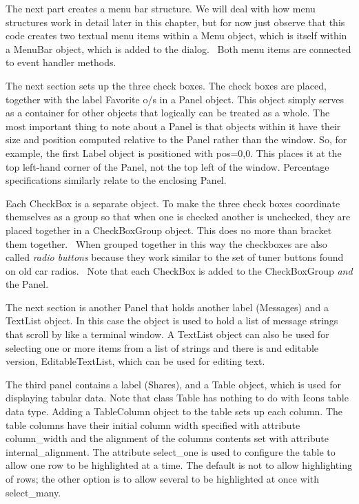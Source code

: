 The next part creates a menu bar structure. We will deal
with how menu structures work in detail later in this chapter, but for
now just observe that this code creates two textual menu items within a
\textsf{Menu} object, which is itself within a \textsf{MenuBar} object,
which is added to the dialog. \ Both menu items are connected to event
handler methods.

The next section sets up the three check boxes. The
check boxes are placed, together with the label {\textquotedbl}Favorite
o/s{\textquotedbl} in a \textsf{Panel} object. This object simply
serves as a container for other objects that logically can be treated
as a whole. The most important thing to note about a \textsf{Panel} is
that objects within it have their size and position computed relative
to the \textsf{Panel} rather than the window. So, for example, the
first \textsf{Label} object is positioned with
\textsf{{\textquotedbl}pos=0,0{\textquotedbl}}. This places it at the
top left-hand corner of the \textsf{Panel}, not the top left of the
window. Percentage specifications similarly relate to the enclosing
\textsf{Panel}.

Each \textsf{CheckBox} is a separate object. To make the three check
boxes coordinate themselves as a group so that when one is checked
another is unchecked, they are placed together in a
\textsf{CheckBoxGroup} object. This does no more than
{\textquotedbl}bracket{\textquotedbl} them together. \ When grouped
together in this way the checkboxes are also called \textit{radio buttons} because they work similar to the set of
tuner buttons found on old car radios. \ Note that each
\textsf{CheckBox} is added to the \textsf{CheckBoxGroup} \textit{and}
the \textsf{Panel}.

The next section is another \textsf{Panel} that holds another label
({\textquotedbl}Messages{\textquotedbl}) and a \textsf{TextList}
object. In this case the object is used to hold a list of message
strings that scroll by like a terminal window. A \textsf{TextList}
object can also be used for selecting one or more items from a list of
strings and there is and editable version, \textsf{EditableTextList},
which can be used for editing text.

The third panel contains a label ({\textquotedbl}Shares{\textquotedbl}),
and a \textsf{Table} object, which is used for displaying tabular data.
Note that class \textsf{Table} has nothing to do with
Icon{\textquotesingle}s table data type. Adding a \textsf{TableColumn}
object to the table sets up each column. The table columns have their
initial column width specified with attribute \textsf{column\_width}
and the alignment of the column{\textquotesingle}s contents set with
attribute \textsf{internal\_alignment}. The attribute
\textsf{select\_one} is used to configure the table to allow one row to
be highlighted at a time. The default is not to allow highlighting of
rows; the other option is to allow several to be highlighted at once
with \textsf{select\_many}.

